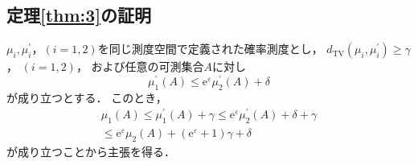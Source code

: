\documentclass{jarticle}
\newcommand{\ee}{\mathrm{e}}
\theoremstyle{definition}
\begin{document}
\subsection{定理\ref{thm:3}の証明}

$\mu_i, \mu_i^\prime$，$(i=1,2)$を同じ測度空間で定義された確率測度とし，
$d_\mathrm{TV}(\mu_i, \mu_i^\prime) \geq \gamma$， $(i=1,2)$，
および任意の可測集合$A$に対し
\begin{equation}
\mu_1^\prime(A) \leq \ee^\varepsilon \mu_2^\prime(A) + \delta
\end{equation}
が成り立つとする．
このとき，
\begin{align}
\mu_1(A) \leq \mu_1^\prime(A)+ \gamma \leq \ee^\varepsilon \mu_2^\prime(A) + \delta + \gamma \nonumber \\
\leq \ee^\varepsilon \mu_2(A) + (\ee^\varepsilon + 1)\gamma + \delta
\end{align}
が成り立つことから主張を得る．
\end{document}

